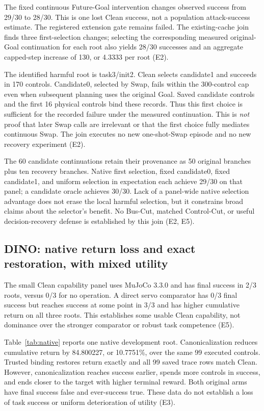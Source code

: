 \documentclass[11pt]{article}
\begin{document}
The fixed continuous Future-Goal intervention changes observed success from
29/30 to 28/30. This is one lost Clean success, not a population attack-success
estimate. The registered extension gate remains failed. The existing-cache
join finds three first-selection changes; selecting the corresponding measured
original-Goal continuation for each root also yields 28/30 successes and an
aggregate capped-step increase of 130, or 4.3333 per root (E2).

The identified harmful root is task3/init2. Clean selects candidate1 and succeeds
in 170 controls. Candidate0, selected by Swap, fails within the 300-control cap
even when subsequent planning uses the original Goal. Saved candidate controls
and the first 16 physical controls bind these records. Thus this first choice
is sufficient for the recorded failure under the measured continuation. This
is \emph{not} proof that later Swap calls are irrelevant or that the first
choice fully mediates continuous Swap. The join executes no new one-shot-Swap
episode and no new recovery experiment (E2).

The 60 candidate continuations retain their provenance as 50 original branches
plus ten recovery branches. Native first selection, fixed candidate0, fixed
candidate1, and uniform selection in expectation each achieve 29/30 on that
panel; a candidate oracle achieves 30/30. Lack of a panel-wide native selection
advantage does not erase the local harmful selection, but it constrains broad
claims about the selector's benefit. No Bus-Cut, matched Control-Cut, or useful
decision-recovery defense is established by this join (E2, E5).

\subsection{DINO: native return loss and exact restoration, with mixed utility}

The small Clean capability panel uses MuJoCo 3.3.0 and has final success in
2/3 roots, versus 0/3 for no operation. A direct servo comparator has 0/3 final
success but reaches success at some point in 3/3 and has higher cumulative
return on all three roots. This establishes some usable Clean capability,
not dominance over the stronger comparator or robust task competence (E5).

Table~\ref{tab:native} reports one native development root. Canonicalization
reduces cumulative return by 84.800227, or 10.7751\%, over the same 99 executed
controls. Trusted binding restores return exactly and all 99 saved trace rows
match Clean. However, canonicalization reaches success earlier, spends more
controls in success, and ends closer to the target with higher terminal reward.
Both original arms have final success false and ever-success true. These data
do not establish a loss of task success or uniform deterioration of utility
(E3).
\end{document}

